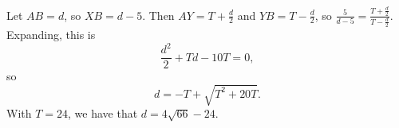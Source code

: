 Let $AB=d$, so $XB=d-5$. Then $AY=T+\frac{d}{2}$ and $YB=T-\frac{d}{2}$, so $\frac{5}{d-5}=\frac{T+\frac{d}{2}}{T-\frac{d}{2}}$. Expanding, this is \[\frac{d^2}{2}+Td-10T=0,\] so \[d=-T+\sqrt{T^2+20T}.\] With $T=24$, we have that $d=\boxed{4\sqrt{66}-24}$.